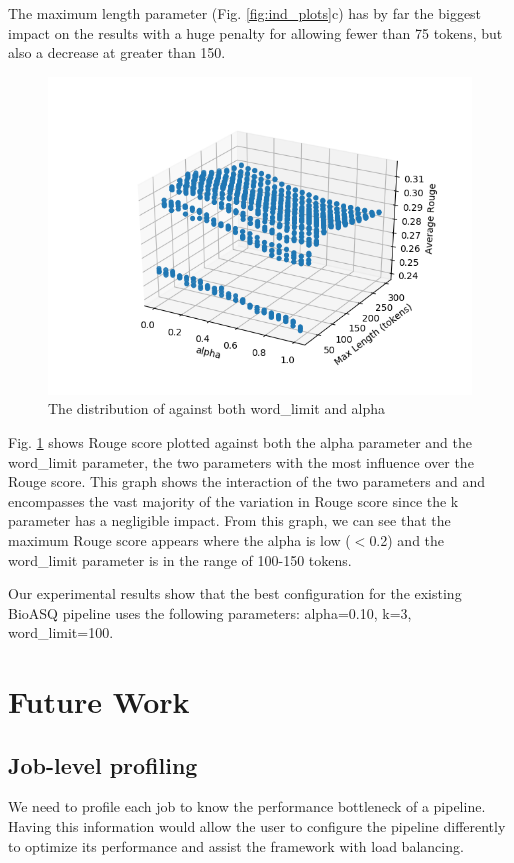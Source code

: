 \documentclass{article}
\begin{document}
    The maximum length parameter (Fig. \ref{fig:ind_plots}c) has by far the biggest impact on the results with a huge penalty for allowing fewer than 75 tokens, but also a decrease at greater than 150.

    \begin{figure}[H]
        \begin{center}
            \includegraphics[width=\textwidth]{fig/alpha_wordcount.png}
        \end{center}
        \caption{The distribution of against both word\_limit and alpha}\label{fig:alpha_wordcount}
    \end{figure}

    Fig. \ref{fig:alpha_wordcount} shows Rouge score plotted against both the alpha parameter and the word\_limit parameter, the two parameters with the most influence over the Rouge score.
    This graph shows the interaction of the two parameters and and encompasses the vast majority of the variation in Rouge score since the k parameter has a negligible impact. From this graph,
    we can see that the maximum Rouge score appears where the alpha is low ($<$0.2) and the word\_limit parameter is in the range of 100-150 tokens.

    Our experimental results show that the best configuration for the existing BioASQ pipeline uses the following parameters: alpha=0.10, k=3, word\_limit=100.


\section{Future Work}
    \subsection{Job-level profiling}
    We need to profile each job to know the performance bottleneck of a pipeline.
    Having this information would allow the user to configure the pipeline differently to optimize its performance and assist the framework with load balancing.
\end{document}
